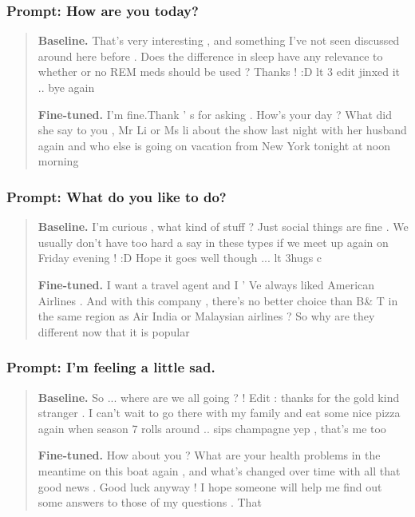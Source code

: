 \documentclass[12pt]{article}
\begin{document}
\subsubsection*{Prompt: How are you today?}
\begin{quote}\small
\textbf{Baseline.} That's very interesting , and something I've not seen discussed around here before . Does the difference in sleep have any relevance to whether or no REM meds should be used ? Thanks ! :D lt 3 edit jinxed it .. bye again

\textbf{Fine-tuned.} I'm fine.Thank ' s for asking . How's your day ? What did she say to you , Mr Li or Ms li about the show last night with her husband again and who else is going on vacation from New York tonight at noon morning
\end{quote}

\subsubsection*{Prompt: What do you like to do?}
\begin{quote}\small
\textbf{Baseline.} I'm curious , what kind of stuff ? Just social things are fine . We usually don't have too hard a say in these types if we meet up again on Friday evening ! :D Hope it goes well though ... lt 3hugs c

\textbf{Fine-tuned.} I want a travel agent and I ’ Ve always liked American Airlines . And with this company , there's no better choice than B\& T in the same region as Air India or Malaysian airlines ? So why are they different now that it is popular
\end{quote}

\subsubsection*{Prompt: I'm feeling a little sad.}
\begin{quote}\small
\textbf{Baseline.} So ... where are we all going ? ! Edit : thanks for the gold kind stranger . I can't wait to go there with my family and eat some nice pizza again when season 7 rolls around .. sips champagne yep , that's me too

\textbf{Fine-tuned.} How about you ? What are your health problems in the meantime on this boat again , and what's changed over time with all that good news . Good luck anyway ! I hope someone will help me find out some answers to those of my questions . That
\end{quote}
\end{document}
